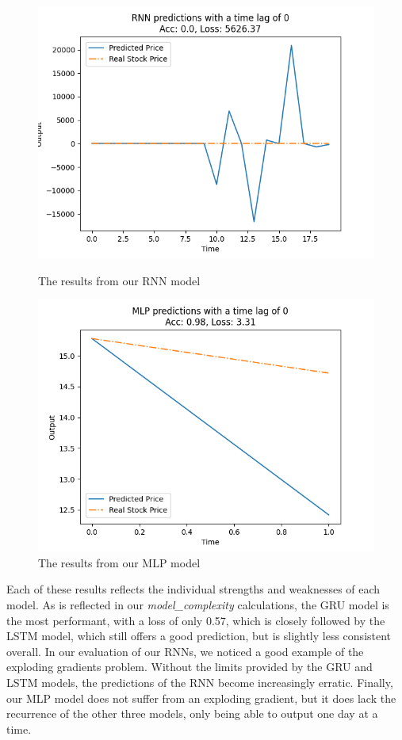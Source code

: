 \documentclass{ledger}
\begin{document}
\begin{figure}[!htbp]
\begin{minipage}{0.49\textwidth}
        \includegraphics[width=\linewidth]{images/rnnEval}
        \caption{The results from our RNN model}\label{Fig:rnnEval}
    \end{minipage}\hfill
    \begin{minipage}{0.49\textwidth}
        \centering
        \includegraphics[width=\linewidth]{images/mlpEval}
        \caption{The results from our MLP model}\label{Fig:mlpEval}
    \end{minipage}
\end{figure}

Each of these results reflects the individual strengths and weaknesses of each model. As is reflected in our \textit{model\_complexity} calculations, the GRU model is the most performant, with a loss of only 0.57, which is closely followed by the LSTM model, which still offers a good prediction, but is slightly less consistent overall. In our evaluation of our RNNs, we noticed a good example of the exploding gradients problem. Without the limits provided by the GRU and LSTM models, the predictions of the RNN become increasingly erratic. Finally, our MLP model does not suffer from an exploding gradient, but it does lack the recurrence of the other three models, only being able to output one day at a time.
\end{document}
